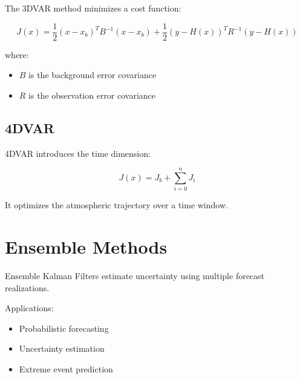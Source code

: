 The 3DVAR method minimizes a cost function:

\begin{equation}
J(x)=
\frac{1}{2}(x-x_b)^TB^{-1}(x-x_b)
+
\frac{1}{2}(y-H(x))^TR^{-1}(y-H(x))
\end{equation}


where:

\begin{itemize}
\item $B$ is the background error covariance
\item $R$ is the observation error covariance
\end{itemize}



\subsection{4DVAR}

4DVAR introduces the time dimension:

\begin{equation}
J(x)=
J_b+
\sum_{i=0}^{n}
J_i
\end{equation}


It optimizes the atmospheric trajectory over a time window.



\section{Ensemble Methods}

Ensemble Kalman Filters estimate uncertainty using multiple
forecast realizations.

Applications:

\begin{itemize}
\item Probabilistic forecasting
\item Uncertainty estimation
\item Extreme event prediction
\end{itemize}

